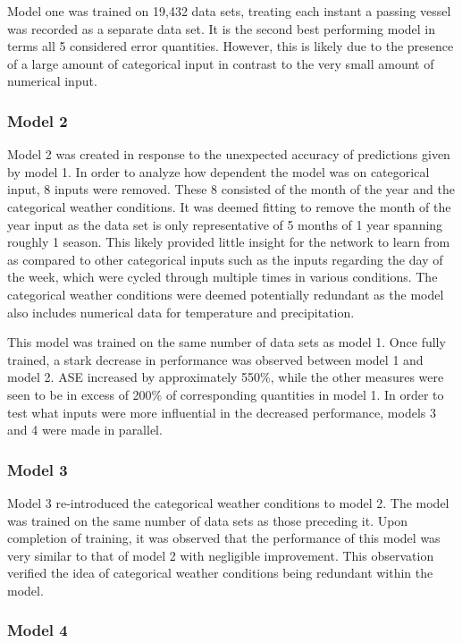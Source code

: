 \documentclass[
10pt, %
letterpaper, %
twoside, %
headinclude,footinclude, %
BCOR5mm, %
]{scrartcl}
\begin{document}
Model one was trained on 19,432 data sets, treating each instant a passing vessel was recorded as a separate data set. It is the second best performing model in terms all 5 considered error quantities. However, this is likely due to the presence of a large amount of categorical input in contrast to the very small amount of numerical input. 

\subsubsection{Model 2}

Model 2 was created in response to the unexpected accuracy of predictions given by model 1. In order to analyze how dependent the model was on categorical input, 8 inputs were removed. These 8 consisted of the month of the year and the categorical weather conditions. It was deemed fitting to remove the month of the year input as the data set is only representative of 5 months of 1 year spanning roughly 1 season. This likely provided little insight for the network to learn from as compared to other categorical inputs such as the inputs regarding the day of the week, which were cycled through multiple times in various conditions. The categorical weather conditions were deemed potentially redundant as the model also includes numerical data for temperature and precipitation. 

This model was trained on the same number of data sets as model 1. Once fully trained, a stark decrease in performance was observed between model 1 and model 2. ASE increased by approximately 550\%, while the other measures were seen to be in excess of 200\% of corresponding quantities in model 1. In order to test what inputs were more influential in the decreased performance, models 3 and 4 were made in parallel.

\subsubsection{Model 3}

Model 3 re-introduced the categorical weather conditions to model 2. The model was trained on the same number of data sets as those preceding it. Upon completion of training, it was observed that the performance of this model was very similar to that of model 2 with negligible improvement. This observation verified the idea of categorical weather conditions being redundant within the model.

\subsubsection{Model 4}
\end{document}
